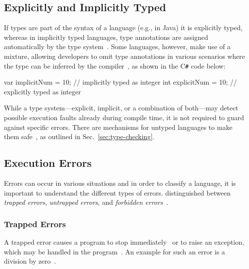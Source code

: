 
\subsection{Explicitly and Implicitly Typed}
\label{sec:explicitly-implicitly-typed}

If types are part of the syntax of a language (e.g., in Java) it is explicitly typed, whereas in implicitly typed languages, type annotations are assigned automatically by the type system~\cite[pp.~97-2--97-3]{TypeSystems:Cardelli:2004}. Some languages, however, make use of a mixture, allowing developers to omit type annotations in various scenarios where the type can be inferred by the compiler~\cite[p.~10]{TypesAndProgrammingLanguages:Pierce:2002}, as shown in the C\texttt{\#} code below:
\begin{CsCode}[numbers=none]
var implicitNum = 10; // implicitly typed as integer
int explicitNum = 10; // explicitly typed as integer
\end{CsCode}
While a type system---explicit, implicit, or a combination of both---may detect possible execution faults already during compile time, it is not required to guard against specific errors. There are mechanisms for untyped languages to make them safe~\cite[p.~97-3]{TypeSystems:Cardelli:2004}, as outlined in Sec.~\ref{sec:type-checking}.

\subsection{Execution Errors}
\label{sec:execution-errors}

Errors can occur in various situations and in order to classify a language, it is important to understand the different types of errors. \citeauthor{TypeSystems:Cardelli:2004} distinguished between \emph{trapped errors}, \emph{untrapped errors}, and \emph{forbidden errors}~\cite[p.~97-3]{TypeSystems:Cardelli:2004}.

\subsubsection{Trapped Errors}

A trapped error causes a program to stop immediately~\cite[p.~97-3]{TypeSystems:Cardelli:2004} or to raise an exception, which may be handled in the program~\cite[p.~7]{TypesAndProgrammingLanguages:Pierce:2002}. An example for such an error is a division by zero~\cite[p.~97-3]{TypeSystems:Cardelli:2004}.

